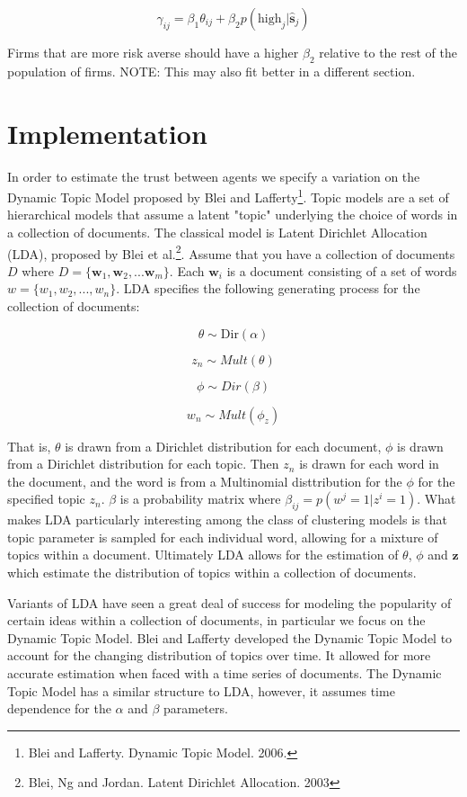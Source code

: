 \documentclass[a4paper]{article}
\begin{document}
\[\gamma_{ij} = \beta_1 \theta_{ij} + \beta_2 p(\text{high}_j|\hat{\textbf{s}}_j)\]

Firms that are more risk averse should have a higher $\beta_2$ relative to the rest of the population of firms. NOTE: This may also fit better in a different section.

\section{Implementation}

In order to estimate the trust between agents we specify a variation on the Dynamic Topic Model proposed by Blei and Lafferty\footnote{Blei and Lafferty. Dynamic Topic Model. 2006.}.  Topic models are a set of hierarchical models that assume a latent "topic" underlying the choice of words in a collection of documents.  The classical model is Latent Dirichlet Allocation (LDA), proposed by Blei et al.\footnote{Blei, Ng and Jordan. Latent Dirichlet Allocation. 2003}.  Assume that you have a collection of documents $D$ where $D = \{\textbf{w}_1, \textbf{w}_2, ... \textbf{w}_m\}$.  Each $\textbf{w}_i$ is a document consisting of a set of words $w = \{w_1, w_2, ..., w_n\}$.  LDA specifies the following generating process for the collection of documents:

\[\theta \sim \text{Dir}(\alpha)\]

\[z_n \sim Mult(\theta)\]

\[\phi \sim Dir(\beta)\]

\[w_n \sim  Mult(\phi_z)\]

That is, $\theta$ is drawn from a Dirichlet distribution for each document,  $\phi$ is drawn from a Dirichlet distribution for each topic.  Then $z_n$ is drawn for each word in the document, and the word is from a Multinomial disttribution for the $\phi$ for the specified topic $z_n$.  $\beta$ is a probability matrix where $\beta_{ij} = p(w^j = 1|z^i =1)$.  What makes LDA particularly interesting among the class of clustering models is that topic parameter is sampled for each individual word, allowing for a mixture of topics within a document.  Ultimately LDA allows for the estimation of $\theta$, $\phi$ and $\textbf{z}$ which estimate the distribution of topics within a collection of documents.

Variants of LDA have seen a great deal of success for modeling the popularity of certain ideas within a collection of documents, in particular we focus on the Dynamic Topic Model.  Blei and Lafferty developed the Dynamic Topic Model to account for the changing distribution of topics over time.  It allowed for more accurate estimation when faced with a time series of documents.  The Dynamic Topic Model has a similar structure to LDA, however, it assumes time dependence for the $\alpha$ and $\beta$ parameters.
\end{document}

